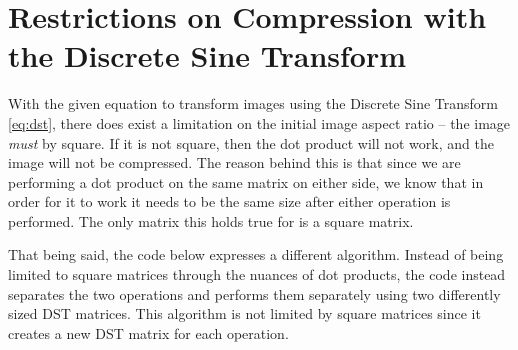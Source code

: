 \section{Restrictions on Compression with the Discrete Sine Transform}

With the given equation to transform images using the Discrete Sine Transform \eqref{eq:dst}, there does exist a limitation on the initial image aspect ratio -- the image \textit{must} by square. If it is not square, then the dot product will not work, and the image will not be compressed. The reason behind this is that since we are performing a dot product on the same matrix on either side, we know that in order for it to work it needs to be the same size after either operation is performed. The only matrix this holds true for is a square matrix.

That being said, the code below expresses a different algorithm. Instead of being limited to square matrices through the nuances of dot products, the code instead separates the two operations and performs them separately using two differently sized DST matrices. This algorithm is not limited by square matrices since it creates a new DST matrix for each operation.

    

